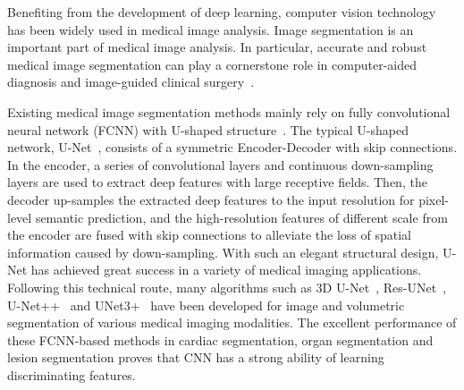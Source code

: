 \documentclass[runningheads]{llncs}
\begin{document}
Benefiting from the development of deep learning, computer vision technology has been widely used in 
medical image analysis. Image segmentation is an important part of medical image analysis. In particular, accurate and robust medical image segmentation can play a cornerstone role in computer-aided diagnosis and image-guided clinical surgery~\cite{unetr,trans-unet}. 

Existing medical image segmentation methods mainly rely on fully convolutional neural network (FCNN) with U-shaped structure~\cite{unet,nnu-net,RA-UNet}. The typical U-shaped network, U-Net~\cite{unet}, consists of a symmetric Encoder-Decoder with skip connections. In the encoder, a series of convolutional layers and continuous down-sampling layers are used to extract deep features with large receptive fields. Then, the decoder up-samples the extracted deep features  to the input resolution for pixel-level semantic prediction, and the high-resolution features of different scale from the encoder are fused with skip connections to alleviate the loss of spatial information caused by down-sampling. With such an elegant structural design, U-Net has achieved great success in a variety of medical imaging applications. Following this technical route, many algorithms such as 3D U-Net~\cite{3D-UNet}, Res-UNet~\cite{res-unet}, U-Net++~\cite{Unet++} and UNet3+~\cite{unet3+} have been developed for image and volumetric segmentation of various medical imaging modalities. The excellent performance of these FCNN-based methods in 
cardiac segmentation, organ segmentation and lesion segmentation proves that CNN has a strong ability of learning discriminating features.
\end{document}
